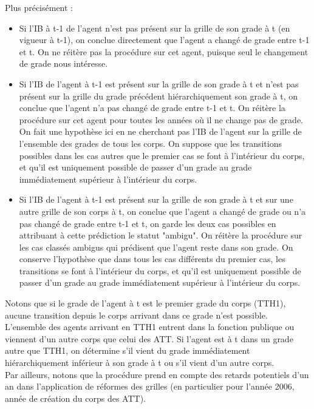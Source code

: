 \documentclass[11pt,a4paper]{article}
\begin{document}
Plus précisément :
\begin{itemize} 
	\item Si l'IB à t-1 de l'agent n'est pas présent sur la grille de son grade à t (en vigueur à t-1), on conclue directement que l'agent a changé de grade entre t-1 et t. On ne réitère pas la procédure sur cet agent, puisque seul le changement de grade nous intéresse. 
	
	\item Si l'IB de l'agent à t-1 est présent sur la grille de son grade à t et n'est pas présent sur la grille du grade précédent hiérarchiquement son grade à t, on conclue que l'agent n'a pas changé de grade entre t-1 et t. On réitère la procédure sur cet agent pour toutes les années où il ne change pas de grade. On fait une hypothèse ici en ne cherchant pas l'IB de l'agent sur la grille de l'ensemble des grades de tous les corps. On suppose que les transitions possibles dans les cas autres que le premier cas se font à l'intérieur du corps, et qu'il est uniquement possible de passer d'un grade au grade immédiatement supérieur à l'intérieur du corps.
	\item Si l'IB de l'agent à t-1 est présent sur la grille de son grade à t et sur une autre grille de son corps à t, on conclue que l'agent a changé de grade ou n'a pas changé de grade entre t-1 et t, on garde les deux cas possibles en attribuant à cette prédiction le statut "ambigu". On réitère la procédure sur les cas classés ambigus qui prédisent que l'agent reste dans son grade. On conserve l'hypothèse que dans tous les cas différents du premier cas, les transitions se font à l'intérieur du corps, et qu'il est uniquement possible de passer d'un grade au grade immédiatement supérieur à l'intérieur du corps.
\end{itemize}

Notons que si le grade de l'agent à t est le premier grade du corps (TTH1), aucune transition depuis le corps arrivant dans ce grade n'est possible. L'ensemble des agents arrivant en TTH1 entrent dans la fonction publique ou viennent d'un autre corps que celui des ATT. Si l'agent est à t dans un grade autre que TTH1, on détermine s'il vient du grade immédiatement hiérarchiquement inférieur à son grade à t ou s'il vient d'un autre corps.\\

Par ailleurs, notons que la procédure prend en compte des retards potentiels d'un an dans l'application de réformes des grilles (en particulier pour l'année 2006, année de création du corps des ATT).\\
\end{document}
